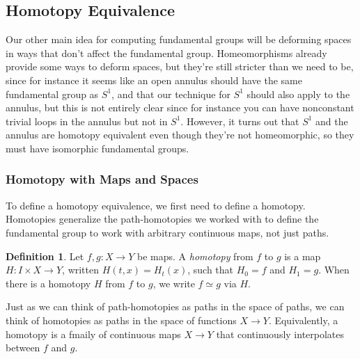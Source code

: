 \documentclass{article}
\theoremstyle{definition}
\newtheorem{defi}[thm]{Definition}
\theoremstyle{remark}
\numberwithin{figure}{section}
\begin{document}
\subsection{Homotopy Equivalence}\label{sec:homotopy}
Our other main idea for computing fundamental groups will be deforming spaces in ways that don't affect the fundamental group. Homeomorphisms already provide some ways to deform spaces, but they're still stricter than we need to be, since for instance it seems like an open annulus should have the same fundamental group as $S^1$, and that our technique for $S^1$ should also apply to the annulus, but this is not entirely clear since for instance you can have nonconstant trivial loops in the annulus but not in $S^1$. However, it turns out that $S^1$ and the annulus are homotopy equivalent even though they're not homeomorphic, so they must have isomorphic fundamental groups.

\subsubsection{Homotopy with Maps and Spaces}
To define a homotopy equivalence, we first need to define a homotopy. Homotopies generalize the path-homotopies we worked with to define the fundamental group to work with arbitrary continuous maps, not just paths.

\begin{defi}
	Let $f, g : X \to Y$ be maps. A \emph{homotopy} from $f$ to $g$ is a map $H : I \times X \to Y$, written $H(t, x) = H_t(x)$, such that $H_0 = f$ and $H_1 = g$. When there is a homotopy $H$ from $f$ to $g$, we write $f \simeq g$ via $H$.
\end{defi}

Just as we can think of path-homotopies as paths in the space of paths, we can think of homotopies as paths in the space of functions $X \to Y$. Equivalently, a homotopy is a fmaily of continuous maps $X \to Y$ that continuously interpolates between $f$ and $g$.
\end{document}
